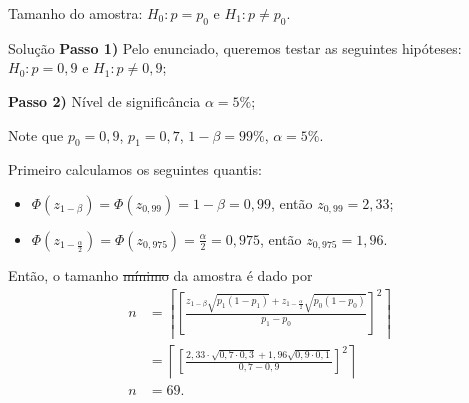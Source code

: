 \documentclass[8pt]{beamer}
\begin{document}
\begin{frame}{Tamanho do amostra: $H_0: p = p_0$ e $H_1: p \neq p_0$.}


\begin{block}{Solução}
	\textbf{Passo 1)} Pelo enunciado, queremos testar as seguintes hipóteses: $H_0: p=0,9$ e $H_1:p \neq 0,9$;
	
	\textbf{Passo 2)} Nível de significância $\alpha=5\%$;
	
	Note que $p_0=0,9$, $p_1=0,7$, $1-\beta=99\%$, $\alpha=5\%$.
	
	 Primeiro calculamos os seguintes quantis:
	\begin{itemize}
		\item $\Phi\left(z_{1-\beta}\right) = \Phi\left( z_{0,99} \right) = 1-\beta=0,99$, então $z_{0,99}=2,33$;
		\item $\Phi\left(z_{1-\frac{\alpha}{2}}\right) = \Phi\left(z_{0,975}\right) = \frac{\alpha}{2} = 0,975$, então $z_{0,975} = 1,96$.
	\end{itemize}
	Então, o tamanho \sout{mínimo} da  amostra é dado por
	\begin{align*}
	n &= \left\lceil \left[ \frac{z_{1-\beta} \sqrt{p_1(1-p_1)} + z_{1-\frac{\alpha}{2}} \sqrt{p_0(1-p_0)}}{p_1 - p_0} \right]^2 \right\rceil\\
	&= \left\lceil \left[ \frac{2,33 \cdot \sqrt{0,7 \cdot 0,3} + 1,96 \sqrt{0,9 \cdot 0,1}}{0,7 - 0,9} \right]^2 \right\rceil\\
	n&= 69. 
	\end{align*}
	
\end{block}

\end{frame}
\end{document}
